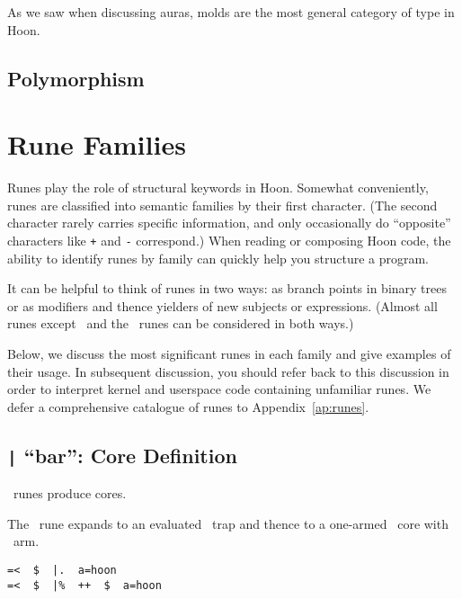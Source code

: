 As we saw when discussing auras, molds are the most general category of type in Hoon.


\subsection{Polymorphism}



\section{Rune Families}


Runes play the role of structural keywords in Hoon.  Somewhat conveniently, runes are classified into semantic families by their first character.  (The second character rarely carries specific information, and only occasionally do “opposite” characters like \texttt{+} and \texttt{-} correspond.)  When reading or composing Hoon code, the ability to identify runes by family can quickly help you structure a program.

It can be helpful to think of runes in two ways:  as branch points in binary trees or as modifiers and thence yielders of new subjects or expressions.  (Almost all runes except \pzapzap~and the \psig~runes can be considered in both ways.)

Below, we discuss the most significant runes in each family and give examples of their usage.  In subsequent discussion, you should refer back to this discussion in order to interpret kernel and userspace code containing unfamiliar runes.  We defer a comprehensive catalogue of runes to Appendix~\ref{ap:runes}.

\subsection{\texttt{|} “bar”:  Core Definition}

\pbar~runes produce cores.

The \barhep~rune expands to an evaluated \bardot~trap and thence to a one-armed \barcen~core with \buc~arm.

\begin{lstlisting}[style=nonumbers]
=<  $  |.  a=hoon
=<  $  |%  ++  $  a=hoon
\end{lstlisting}


